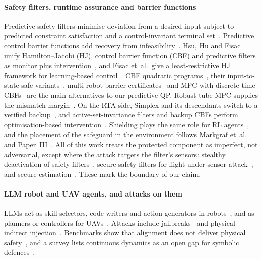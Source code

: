 \paragraph{Safety filters, runtime assurance and barrier functions}
Predictive safety filters minimise deviation from a desired input subject to
predicted constraint satisfaction and a control-invariant terminal
set~\cite{wabersich2018linear,wabersich2021psf,wabersich2023datadriven,hewing2020mpclearning}.
Predictive control barrier functions add recovery from
infeasibility~\cite{wabersich2023pcbf}. Hsu, Hu and Fisac unify
Hamilton--Jacobi (HJ), control barrier function (CBF) and predictive filters
as monitor plus intervention~\cite{hsu2024safetyfilter}, and Fisac et~al.\
give a least-restrictive HJ framework for learning-based
control~\cite{fisac2019general}. CBF quadratic
programs~\cite{ames2017cbf,ames2019cbf}, their input-to-state-safe
variants~\cite{kolathaya2019issf}, multi-robot barrier
certificates~\cite{wang2017multirobot} and MPC with discrete-time
CBFs~\cite{zeng2021mpccbf} are the main alternatives to our predictive QP.
Robust tube MPC supplies the mismatch
margin~\cite{mayne2005tube,chisci2001,limon2002iss,kohler2021robust}.
On the RTA side, Simplex and its descendants switch to a verified
backup~\cite{seto1998simplex,sha2001simplex,mehmood2022bbsimplex}, and
active-set-invariance filters and backup CBFs perform optimisation-based
intervention~\cite{gurriet2018online,chen2021backupcbf,hobbs2023rta}.
Shielding plays the same role for RL agents~\cite{alshiekh2018shielding}, and
the placement of the safeguard in the environment follows Markgraf
et~al.~\cite{markgraf2025actionprojection} and Paper~III~\cite{paperIII}. All of
this work treats the protected component as imperfect, not adversarial,
except where the attack targets the filter's sensors: stealthy deactivation
of safety filters~\cite{arnstrom2024stealthy}, secure safety filters for
flight under sensor attack~\cite{tan2025securesf}, and secure
estimation~\cite{fawzi2014secure}. These mark the boundary of our claim.

\paragraph{LLM robot and UAV agents, and attacks on them} LLMs act as skill
selectors, code writers and action generators in
robots~\cite{ahn2022saycan,liang2023cap,vemprala2024chatgpt,brohan2023rt2},
and as planners or controllers for
UAVs~\cite{chen2023typefly,tagliabue2023real,javaid2024llmuav}. Attacks include
jailbreaks~\cite{robey2025robopair,zhang2025badrobot,lu2024poex} and physical
indirect injection~\cite{burbano2025chai}. Benchmarks show that alignment does
not deliver physical safety~\cite{tang2024physicalsafety}, and a survey lists
continuous dynamics as an open gap for symbolic
defences~\cite{huang2025trustsurvey}.

